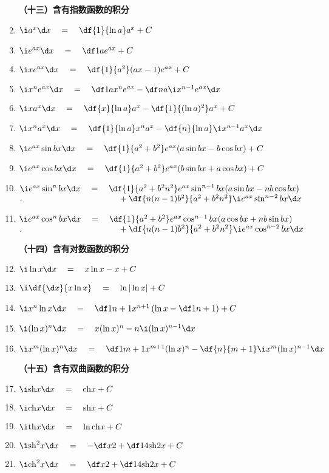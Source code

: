 \begin{enumerate}
\bigskip
{\bf （十三）含有指数函数的积分}
  \item $\i a^x{\d x}\quad=\quad\df{1}{\ln a}a^x+C$
  \item $\i e^{ax}{\d x}\quad=\quad\df 1ae^{ax}+C$
  \item $\i xe^{ax}{\d x}\quad=\quad\df{1}{a^2}(ax-1)e^{ax}+C$
  \item $\i x^ne^{ax}{\d x}\quad=\quad\df 1ax^ne^{ax}-\df na\i x^{n-1}e^{ax}{\d x}$
  \item $\i xa^x{\d x}\quad=\quad\df{x}{\ln a}a^x-\df{1}{(\ln a)^2}a^x+C$
  \item $\i x^na^x{\d x}\quad=\quad\df{1}{\ln a}x^na^x-\df{n}{\ln a}\i x^{n-1}a^x{\d x}$
  \item $\i e^{ax}\sin bx{\d x}\quad=\quad\df{1}{a^2+b^2}e^{ax}(a\sin bx-b\cos bx)+C$
  \item $\i e^{ax}\cos bx{\d x}\quad=\quad\df{1}{a^2+b^2}e^{ax}(b\sin bx+a\cos bx)+C$
  \item $\i e^{ax}\sin^nbx{\d x}\quad=\quad\df{1}{a^2+b^2n^2}e^{ax}\sin^{n-1}bx(a\sin
  bx-nb\cos bx)$\\
  $.\hspace{4cm}+\df{n(n-1)b^2}{a^2+b^2n^2}\i e^{ax}\sin^{n-2}bx{\d x}$
  \item $\i e^{ax}\cos^nbx{\d x}\quad=\quad\df{1}{a^2+b^2}e^{ax}\cos^{n-1}bx(a\cos bx+nb\sin
  bx)$\\
  $.\hspace{4cm}+\df{n(n-1)b^2}{a^2+b^2n^2}\i e^{ax}\cos^{n-2}bx{\d x}$

\bigskip
{\bf （十四）含有对数函数的积分}
  \item $\i\ln x{\d x}\quad=\quad x\ln x-x+C$
  \item $\i\df{{\d x}}{x\ln x}\quad=\quad\ln|\ln x|+C$
  \item $\i x^n\ln x{\d x}\quad=\quad\df 1{n+1}x^{n+1}\left(\ln x-\df 1{n+1}\right)+C$
  \item $\i(\ln x)^n{\d x}\quad=\quad x(\ln x)^n-n\i(\ln x)^{n-1}{\d x}$
  \item $\i x^m(\ln x)^n{\d x}\quad=\quad\df 1{m+1}x^{m+1}(\ln x)^n-\df{n}{m+1}\i x^m(\ln
  x)^{n-1}{\d x}$

\bigskip
{\bf （十五）含有双曲函数的积分}
  \item $\i\mathrm{sh}x{\d x}\quad=\quad\mathrm{ch}x+C$
  \item $\i\mathrm{ch}x{\d x}\quad=\quad\mathrm{sh}x+C$
  \item $\i\mathrm{th}x{\d x}\quad=\quad\ln\mathrm{ch}x+C$
  \item $\i\mathrm{sh}^2x{\d x}\quad=\quad -\df x2+\df 14\mathrm{sh}2x+C$
  \item $\i\mathrm{ch}^2x{\d x}\quad=\quad\df x2+\df 14\mathrm{sh}2x+C$


\end{enumerate}
